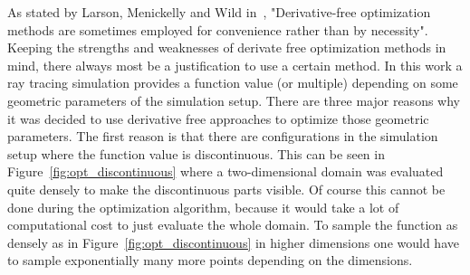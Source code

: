 \documentclass[a4paper,10pt]{article}
\newcommand{\figref}[1]{Figure~\ref{#1}}
\begin{document}
    As stated by Larson, Menickelly and Wild in~\cite{derivative_free_methods},
    "Derivative-free optimization methods are sometimes employed for 
    convenience rather than by necessity".
    Keeping the strengths and weaknesses of derivate free optimization
    methods in mind, there always most be a justification to use
    a certain method.
    In this work a ray tracing simulation provides a function value
    (or multiple) depending on some geometric parameters of the 
    simulation setup.
    There are three major reasons why it was decided to use derivative
    free approaches to optimize those geometric parameters.
    The first reason is that there are configurations in the
    simulation setup where the function value is discontinuous.
    This can be seen in \figref{fig:opt_discontinuous} where a two-dimensional
    domain was evaluated quite densely to make the discontinuous
    parts visible.
    Of course this cannot be done during the optimization algorithm, 
    because it would take a lot of computational cost to just evaluate
    the whole domain.
    To sample the function as densely as in \figref{fig:opt_discontinuous}
    in higher dimensions one would have to sample exponentially many
    more points depending on the dimensions.
\end{document}
